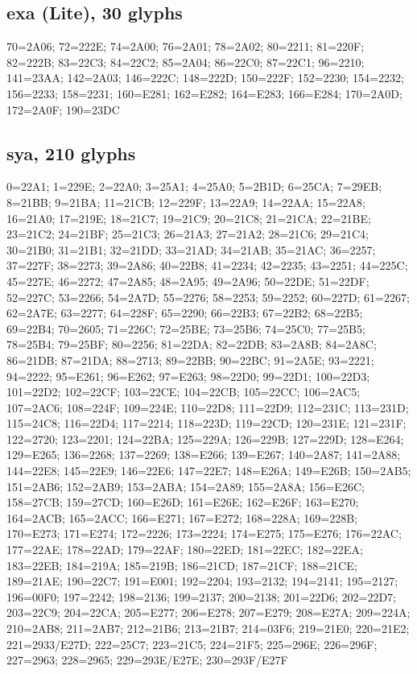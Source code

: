 \subsection*{exa (Lite), 30 glyphs}
\raggedright\small 70=2A06; 72=222E; 74=2A00; 76=2A01; 78=2A02; 80=2211;
81=220F; 82=222B; 83=22C3; 84=22C2; 85=2A04; 86=22C0; 87=22C1; 96=2210;
141=23AA; 142=2A03; 146=222C; 148=222D; 150=222F; 152=2230; 154=2232; 156=2233;
158=2231; 160=E281; 162=E282; 164=E283; 166=E284; 170=2A0D; 172=2A0F;
190=23DC\par

\subsection*{sya, 210 glyphs}
\raggedright\small 0=22A1; 1=229E; 2=22A0; 3=25A1; 4=25A0; 5=2B1D; 6=25CA;
7=29EB; 8=21BB; 9=21BA; 11=21CB; 12=229F; 13=22A9; 14=22AA; 15=22A8; 16=21A0;
17=219E; 18=21C7; 19=21C9; 20=21C8; 21=21CA; 22=21BE; 23=21C2; 24=21BF;
25=21C3; 26=21A3; 27=21A2; 28=21C6; 29=21C4; 30=21B0; 31=21B1; 32=21DD;
33=21AD; 34=21AB; 35=21AC; 36=2257; 37=227F; 38=2273; 39=2A86; 40=22B8;
41=2234; 42=2235; 43=2251; 44=225C; 45=227E; 46=2272; 47=2A85; 48=2A95;
49=2A96; 50=22DE; 51=22DF; 52=227C; 53=2266; 54=2A7D; 55=2276; 58=2253;
59=2252; 60=227D; 61=2267; 62=2A7E; 63=2277; 64=228F; 65=2290; 66=22B3;
67=22B2; 68=22B5; 69=22B4; 70=2605; 71=226C; 72=25BE; 73=25B6; 74=25C0;
77=25B5; 78=25B4; 79=25BF; 80=2256; 81=22DA; 82=22DB; 83=2A8B; 84=2A8C;
86=21DB; 87=21DA; 88=2713; 89=22BB; 90=22BC; 91=2A5E; 93=2221; 94=2222;
95=E261; 96=E262; 97=E263; 98=22D0; 99=22D1; 100=22D3; 101=22D2; 102=22CF;
103=22CE; 104=22CB; 105=22CC; 106=2AC5; 107=2AC6; 108=224F; 109=224E; 110=22D8;
111=22D9; 112=231C; 113=231D; 115=24C8; 116=22D4; 117=2214; 118=223D; 119=22CD;
120=231E; 121=231F; 122=2720; 123=2201; 124=22BA; 125=229A; 126=229B; 127=229D;
128=E264; 129=E265; 136=2268; 137=2269; 138=E266; 139=E267; 140=2A87; 141=2A88;
144=22E8; 145=22E9; 146=22E6; 147=22E7; 148=E26A; 149=E26B; 150=2AB5; 151=2AB6;
152=2AB9; 153=2ABA; 154=2A89; 155=2A8A; 156=E26C; 158=27CB; 159=27CD; 160=E26D;
161=E26E; 162=E26F; 163=E270; 164=2ACB; 165=2ACC; 166=E271; 167=E272; 168=228A;
169=228B; 170=E273; 171=E274; 172=2226; 173=2224; 174=E275; 175=E276; 176=22AC;
177=22AE; 178=22AD; 179=22AF; 180=22ED; 181=22EC; 182=22EA; 183=22EB; 184=219A;
185=219B; 186=21CD; 187=21CF; 188=21CE; 189=21AE; 190=22C7; 191=E001; 192=2204;
193=2132; 194=2141; 195=2127; 196=00F0; 197=2242; 198=2136; 199=2137; 200=2138;
201=22D6; 202=22D7; 203=22C9; 204=22CA; 205=E277; 206=E278; 207=E279; 208=E27A;
209=224A; 210=2AB8; 211=2AB7; 212=21B6; 213=21B7; 214=03F6; 219=21E0; 220=21E2;
221=2933/E27D; 222=25C7; 223=21C5; 224=21F5; 225=296E; 226=296F; 227=2963;
228=2965; 229=293E/E27E; 230=293F/E27F\par

